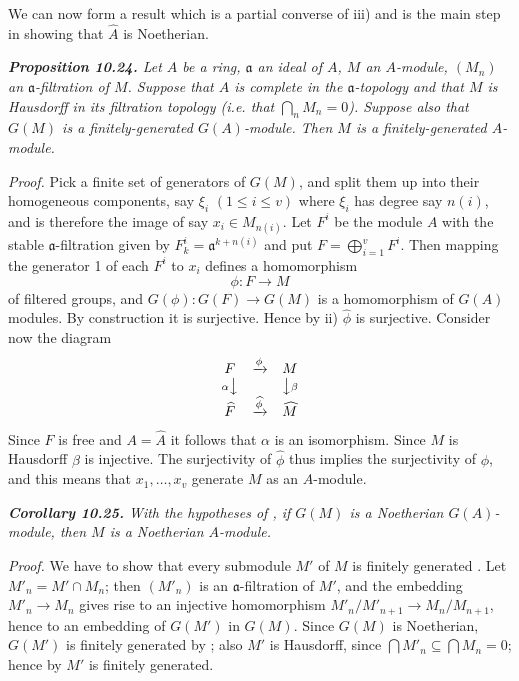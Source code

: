 We can now form a result which is a partial converse of  iii) and is the
main step in showing that $\widehat A$ is Noetherian.

\medskip
\noindent\textit{\textbf{Proposition 10.24.} Let $A$ be a ring, $\mathfrak a$ an ideal of $A$, $M$ an $A$-module, $(M_n)$ an
$\mathfrak a$-filtration of $M$.  Suppose that $A$ is complete in the $\mathfrak a$-topology and that $M$ is
Hausdorff in its filtration topology (i.e. that $\bigcap_n M_n=0$).  Suppose also that
$G(M)$ is a finitely-generated $G(A)$-module.  Then $M$ is a finitely-generated
$A$-module.}

\noindent\emph{Proof.}  Pick a finite set of generators of $G(M)$, and split them up into their
homogeneous components, say $\xi_i$ $(1\leq i\leq v)$ where $\xi_i$ has degree say $n(i)$, and is
therefore the image of say $x_i\in M_{n(i)}$.  Let $F^i$ be the module $A$ with the stable
$\mathfrak a$-filtration given by $F_k^i=\mathfrak a^{k+n(i)}$ and put $F=\bigoplus_{i=1}^vF^i$.  Then mapping the
generator 1 of each $F^i$ to $x_i$ defines a homomorphism
\[
\phi:F\longrightarrow M
\]
of filtered groups, and $G(\phi):G(F)\longrightarrow G(M)$ is a homomorphism of $G(A)$
modules.  By construction it is surjective.  Hence by  ii) $\widehat\phi$ is surjective.
Consider now the diagram
\[
\begin{array}{ccc}
F&\xrightarrow{\phi}&M\\
{\scriptstyle\alpha}\big\downarrow&&\big\downarrow{\scriptstyle\beta}\\
\widehat F&\xrightarrow{\widehat\phi}&\widehat M
\end{array}
\]
Since $F$ is free and $A=\widehat A$ it follows that $\alpha$ is an isomorphism.  Since $M$ is
Hausdorff $\beta$ is injective.  The surjectivity of $\widehat\phi$ thus implies the surjectivity of $\phi$,
and this means that $x_1,\ldots,x_v$ generate $M$ as an $A$-module.\proofbox

\medskip
\noindent\textit{\textbf{Corollary 10.25.} With the hypotheses of , if $G(M)$ is a Noetherian
$G(A)$-module, then $M$ is a Noetherian $A$-module.}

\noindent\emph{Proof.}  We have to show that every submodule $M'$ of $M$ is finitely generated
.  Let $M'_n=M'\cap M_n$; then $(M'_n)$ is an $\mathfrak a$-filtration of $M'$, and the embedding $M'_n\longrightarrow M_n$ gives rise to an injective homomorphism $M'_n/M'_{n+1}\longrightarrow
M_n/M_{n+1}$, hence to an embedding of $G(M')$ in $G(M)$.  Since $G(M)$ is Noetherian,
$G(M')$ is finitely generated by ; also $M'$ is Hausdorff, since $\bigcap M'_n\subseteq
\bigcap M_n=0$; hence by  $M'$ is finitely generated.\proofbox

